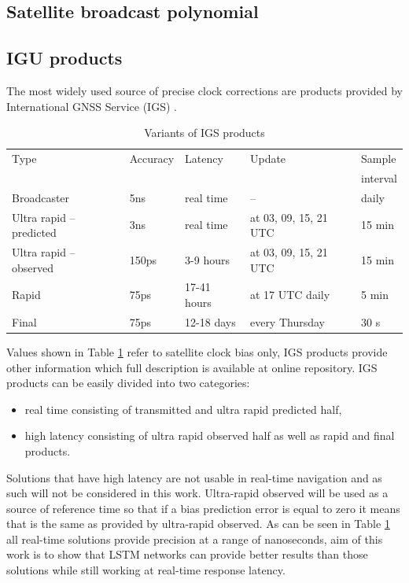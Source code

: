 \subsection{Satellite broadcast polynomial}

\subsection{IGU products}
The most widely used source of precise clock corrections are products provided 
by International GNSS Service (IGS) \cite{Kouba2009}.
\begin{table}[htb] 
	\centering
	\caption{Variants of IGS products}
	\label{tab:igs_products}
	\begin{tabular*}{\textwidth}{*{5}{l}}
		\hline
		\hline
		Type& Accuracy& Latency& Update& Sample \\
		&&&&interval\\
		\hline
		Broadcaster & 5ns & real time & -- & daily  \\
		Ultra rapid -- predicted & 3ns & real time & at 03, 09, 15, 21 UTC & 15 min  \\
		Ultra rapid -- observed & 150ps & 3-9 hours & at 03, 09, 15, 21 UTC & 15 min  \\
		Rapid & 75ps & 17-41 hours & at 17 UTC daily & 5 min \\
		Final & 75ps & 12-18 days & every Thursday & 30 s \\
		\hline
		\hline
	\end{tabular*}
\end{table}
Values shown in Table \ref{tab:igs_products} refer to satellite clock bias only,  IGS products
provide other information which full description  is available at online repository. 
IGS products can be easily divided into two categories:
\begin{itemize}
	\item real time consisting of transmitted and ultra rapid predicted half,
	\item high latency consisting of ultra rapid observed half as well as rapid and final products.
\end{itemize}
Solutions that have high latency are not usable in real-time navigation and as such will not be
considered in this work. Ultra-rapid observed will be used as a source of
reference time so that if a bias prediction error is equal to zero it means that is
the same as provided by ultra-rapid observed.
As can be seen in Table \ref{tab:igs_products} all real-time solutions provide precision 
at a range of nanoseconds, aim of this work is to show that LSTM networks can provide 
better results than those solutions while still working at real-time response latency.

